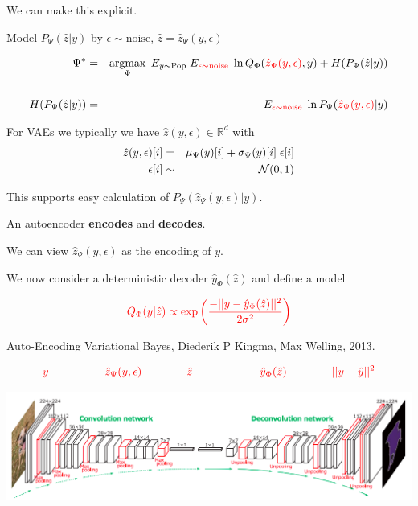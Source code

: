 {\vfill
We can make this explicit.

\vfill
Model $P_\Psi(\hat{z}|y)$ by $\epsilon \sim \mathrm{noise}$, $\hat{z} = \hat{z}_\Psi(y,\epsilon)$

\vfill
{}
\bigskip
\begin{eqnarray*}
\Psi^* & = & \operatorname*{argmax}_\Psi \; E_{y \sim \mathrm{Pop}}\;E_{\color{red} \epsilon \sim \mathrm{noise}}\;\ln Q_\Phi({\color{red} \hat{z}_\Psi(y,\epsilon)},y) +  H(P_\Psi(\hat{z}|y)) \\
\\
H(P_\Psi(\hat{z}|y)) & = & E_{\color{red} \epsilon \sim \mathrm{noise}}\;\ln P_\Psi({\color{red} \hat{z}_\Psi(y,\epsilon)}|y)
\end{eqnarray*}

\vfill
For VAEs we typically we have $\hat{z}(y,\epsilon) \in \mathbb{R}^d$ with
\begin{eqnarray*}
\hat{z}(y,\epsilon)[i] & = & \mu_\Psi(y)[i] + \sigma_\Psi(y)[i]\;\epsilon[i] \\
\epsilon[i] & \sim & {\cal N}(0,1)
\end{eqnarray*}

\vfill
This supports easy calculation of $P_\Psi(\hat{z}_\Psi(y,\epsilon)|y)$.


An autoencoder {\bf encodes} and {\bf decodes}.

\vfill
We can view $\hat{z}_\Psi(y,\epsilon)$ as the encoding of $y$.

\vfill
We now consider a deterministic decoder $\hat{y}_\Phi(\hat{z})$ and define a model

$${\color{red} Q_\Phi(y|\hat{z}) \propto \exp\left(\frac{- ||y - \hat{y}_\Phi(\hat{z})||^2}{2\sigma^2}\right)}$$


Auto-Encoding Variational Bayes, Diederik P Kingma, Max Welling, 2013.

\vfill
$${\color{red}y \hspace{5em}  \hat{z}_\Psi(y,\epsilon) \hspace{4em} \hat{z} \hspace{6em} \hat{y}_\Phi(\hat{z}) \hspace{4em}||y - \hat{y}||^2}$$
\centerline{\includegraphics[width=9in]{../images/Deconv}}

}
